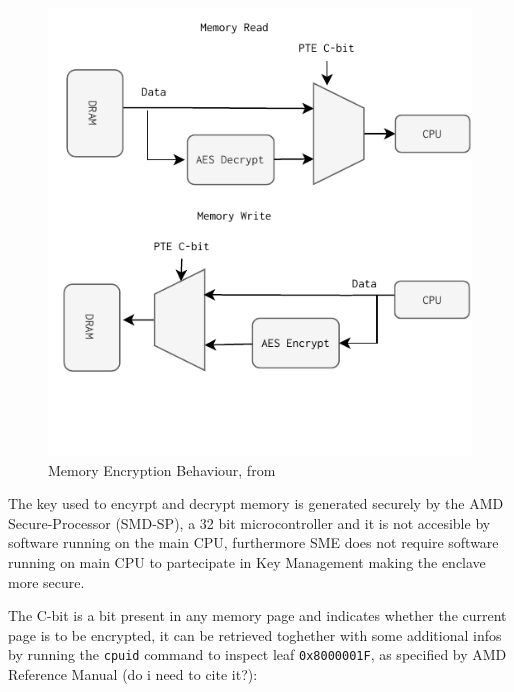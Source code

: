 \documentclass[twocolumn]{article}
\begin{document}
    \begin{figure}
        \centering
        \includegraphics[scale=0.9]{img/read-write.pdf}
        \caption{Memory Encryption Behaviour, from \cite{memory-encryption}}
    \end{figure}

    The key used to encyrpt and decrypt memory is generated securely by the AMD Secure-Processor (SMD-SP), a 32 bit microcontroller and it is not accesible by software running on the main CPU, furthermore SME does not require software running on main CPU to partecipate in Key Management making the enclave more secure.

    The C-bit is a bit present in any memory page and indicates whether the current page is to be encrypted, it can be retrieved toghether with some additional infos by running the \texttt{cpuid} command to inspect leaf \texttt{0x8000001F}, as specified by AMD Reference Manual (do i need to cite it?):
\end{document}
